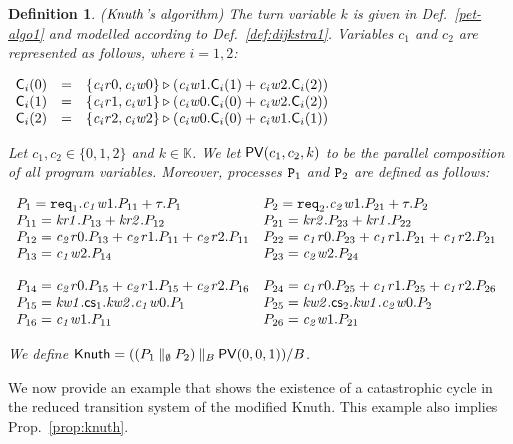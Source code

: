 \documentclass[copyright,creativecommons]{eptcs}
\newtheorem{definition}[theorem]{Definition}
\newcommand{\rop}{\triangleright}
\newcommand{\kvalues}{{\mathbb K}}
\newcommand{\Cv}{{\sf C}}
\newcommand{\rk}[1]{{\it kr #1}}
\newcommand{\wk}[1]{{\it kw #1}}
\newcommand{\rc}[1]{{\it c_{#1}r}}
\newcommand{\wc}[1]{{\it c_{#1}w}}
\newcommand{\vp}{{\sf PV}}
\newcommand{\req}{{\tt req}}
\newcommand{\cs}{{\sf cs}}
\newcommand{\knuth}{{\it Knuth}}
\newcommand{\knutha}{{\sf Knuth}} \newcommand{\knuthb}{\knutha}
\newcommand{\proc}{{\tt P}}
\begin{document}
\begin{definition}\rm\label{def:knuth1} ({\it $\knuth$'s algorithm}) 
The turn variable $k$ is given in Def.~\ref{pet-algo1} and modelled according to Def.~\ref{def:dijkstra1}. Variables $c_1$
and $c_2$ are represented as follows, where $i = 1, 2$:

\vspace{0.1cm}
\hspace{3.5cm}
$\begin{array}{l c l}
\Cv_i(0) & = & \{\rc{i}0, \wc{i}0\} \rop (\wc{i}1.\Cv_i(1) +
\wc{i}2.\Cv_i(2)) \\
\Cv_i(1) & = & \{\rc{i}1, \wc{i}1\} \rop (\wc{i}0.\Cv_i(0) +
\wc{i}2.\Cv_i(2))\\
\Cv_i(2) & = & \{\rc{i}2, \wc{i}2\} \rop (\wc{i}0.\Cv_i(0) +
\wc{i}1.\Cv_i(1))
\end{array}$

\vspace{0.15cm}

\noindent Let  $c_1, c_2 \in \{0,1,2\}$  and $k \in \kvalues$. We
let $\vp( c_1, c_2, k)$ to be the parallel composition of all program
variables. Moreover, processes $\proc_1$ and $\proc_2$ are defined as
follows: 

\vspace{0.1cm}

\hspace{1.5cm}
$\begin{array}{l l}
P_{1} = \req_1.\wc{1}1.P_{11} + \tau.P_{1} \quad\quad &
P_{2} = \req_2.\wc{2}1.P_{21} + \tau.P_{2} \\
P_{11} = \rk{1}.P_{13} + \rk{2}.P_{12} &
P_{21} = \rk{2}.P_{23} + \rk{1}.P_{22} \\
P_{12} = \rc{2}0.P_{13} + \rc{2}1.P_{11} + \rc{2}2.P_{11} &
P_{22} = \rc{1}0.P_{23} + \rc{1}1.P_{21} + \rc{1}2.P_{21} \\
P_{13} = \wc{1}2.P_{14} &
P_{23} = \wc{2}2.P_{24} \\
\end{array}$

\hspace{1.5cm}
$\begin{array}{l l}
P_{14} = \rc{2}0.P_{15} + \rc{2}1.P_{15} + \rc{2}2.P_{16} &
P_{24} = \rc{1}0.P_{25} + \rc{1}1.P_{25} + \rc{1}2.P_{26} \\
P_{15} = \wk{1}.\cs_1.\wk{2}.\wc{1}0.P_1 &
P_{25} = \wk{2}.\cs_2.\wk{1}.\wc{2}0.P_2 \\
P_{16} = \wc{1}1.P_{11} &
P_{26} = \wc{2}1.P_{21} 
\end{array}$

\noindent We define $\knuthb = ((P_1 \:\|_\emptyset \: P_2) \:\|_B\: \vp(0,
0, 1))/B$. 
\end{definition}
We now provide an example that shows the existence of a catastrophic cycle
in the reduced transition system of the modified \knutha. This example also
implies Prop.~\ref{prop:knuth}.
\end{document}

